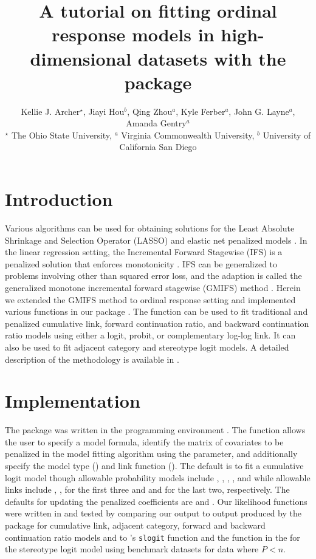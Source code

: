 \documentclass[article, shortclass, nojss]{jss}
\title{A tutorial on fitting ordinal response models in high-dimensional datasets with the\pkg{ordinalgmifs} package}
\author{Kellie J. Archer$^\star$,  Jiayi Hou$^b$, Qing Zhou$^a$,  Kyle Ferber$^a$,  John G. Layne$^a$,  Amanda Gentry$^a$\\
$^\star$ The Ohio State University,
$^a$ Virginia Commonwealth University,
$^b$ University of California San Diego}
\begin{document}
\section{Introduction}
Various algorithms can be used for obtaining solutions for the Least Absolute Shrinkage and Selection Operator (LASSO) \cite{Tibs1996, Tibs1997} and elastic net penalized models \cite{Zou}. In the linear regression setting, the Incremental Forward Stagewise (IFS) is a penalized solution that enforces monotonicity \cite{Hastie}. IFS can be generalized to problems involving other than squared error loss, and the adaption is called the generalized monotone incremental forward stagewise (GMIFS) method \cite{Hastie}. Herein we extended the GMIFS method  \cite{Hastie} to ordinal response setting and implemented various functions in our   package \cite{ArcherCI}. The  function can be used to fit traditional and penalized cumulative link, forward continuation ratio, and backward continuation ratio models using either a logit, probit, or complementary log-log link. It can also be used to fit adjacent category and stereotype logit models. A detailed description of the methodology is available in \cite{ArcherCI}.

\section{Implementation}
The  package was written in the  programming environment \cite{RTeam}.  The  function allows the user to specify a model formula, identify the matrix of covariates to be penalized in the model fitting algorithm using the  parameter, and additionally specify the model type () and link function (). The default is to fit a cumulative logit model though allowable probability models include , , , , and  while allowable links include , ,  for the first three and  and  for the last two, respectively. The defaults for updating the penalized coefficients are  and . Our likelihood functions were written in  and  tested by comparing our  output to output produced by the    package for cumulative link, adjacent category, forward and backward continuation ratio models and to 's \texttt{slogit} function and the  function in the   for the stereotype logit model using benchmark datasets for data where $P<n$.
\end{document}
